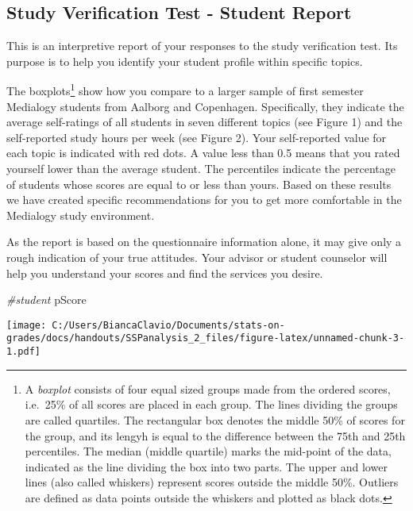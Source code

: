 \documentclass[]{article}
\title{}
\author{}
\date{}
\newenvironment{Shaded}{\begin{snugshade}}{\end{snugshade}}
\newcommand{\CommentTok}[1]{\textcolor[rgb]{0.56,0.35,0.01}{\textit{{#1}}}}
\newcommand{\NormalTok}[1]{{#1}}
\let\rmarkdownfootnote\footnote%
\def\footnote{\protect\rmarkdownfootnote}
\begin{document}
\subsection{Study Verification Test - Student
Report}\label{study-verification-test---student-report}

This is an interpretive report of your responses to the study
verification test. Its purpose is to help you identify your student
profile within specific topics.

The boxplots\footnote{A \emph{boxplot} consists of four equal sized
  groups made from the ordered scores, i.e.~25\% of all scores are
  placed in each group. The lines dividing the groups are called
  quartiles. The rectangular box denotes the middle 50\% of scores for
  the group, and its lengyh is equal to the difference between the 75th
  and 25th percentiles. The median (middle quartile) marks the mid-point
  of the data, indicated as the line dividing the box into two parts.
  The upper and lower lines (also called whiskers) represent scores
  outside the middle 50\%. Outliers are defined as data points outside
  the whiskers and plotted as black dots.} show how you compare to a
larger sample of first semester Medialogy students from Aalborg and
Copenhagen. Specifically, they indicate the average self-ratings of all
students in seven different topics (see Figure 1) and the self-reported
study hours per week (see Figure 2). Your self-reported value for each
topic is indicated with red dots. A value less than 0.5 means that you
rated yourself lower than the average student. The percentiles indicate
the percentage of students whose scores are equal to or less than yours.
Based on these results we have created specific recommendations for you
to get more comfortable in the Medialogy study environment.

As the report is based on the questionnaire information alone, it may
give only a rough indication of your true attitudes. Your advisor or
student counselor will help you understand your scores and find the
services you desire.

\begin{Shaded}
\begin{Highlighting}[]
\CommentTok{#student}
\NormalTok{pScore}
\end{Highlighting}
\end{Shaded}

\texttt{[image: C:/Users/BiancaClavio/Documents/stats-on-grades/docs/handouts/SSPanalysis\_2\_files/figure-latex/unnamed-chunk-3-1.pdf]}
\end{document}
